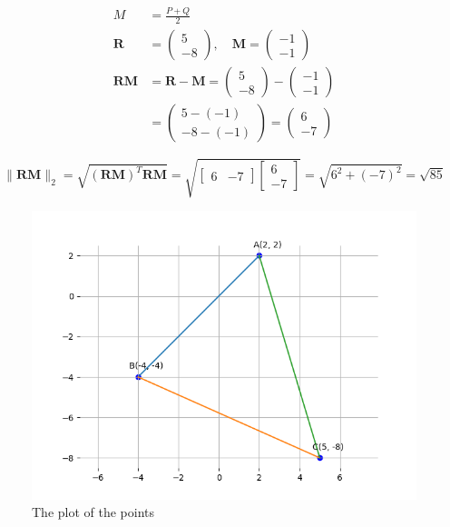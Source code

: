 \documentclass[journal]{IEEEtran}
\numberwithin{equation}{enumi}
\numberwithin{figure}{enumi}
\begin{document}
\begin{align*}
 M &= \frac{P + Q}{2} \\
\mathbf{R} &= \begin{pmatrix} 5 \\ -8 \end{pmatrix}, \quad \mathbf{M} = \begin{pmatrix} -1 \\ -1 \end{pmatrix} \\
\mathbf{RM} &= \mathbf{R} - \mathbf{M} = \begin{pmatrix} 5 \\ -8 \end{pmatrix} - \begin{pmatrix} -1 \\ -1 \end{pmatrix} \\
&= \begin{pmatrix} 5 - (-1) \\ -8 - (-1) \end{pmatrix} = \begin{pmatrix} 6 \\ -7 \end{pmatrix}
\end{align*}




\[
\| \mathbf{RM} \|_2 = \sqrt{\mathbf{(RM)
}^T \mathbf{RM}} = \sqrt{\begin{bmatrix} 6 & -7 \end{bmatrix} \begin{bmatrix} 6 \\ -7 \end{bmatrix}} = \sqrt{6^2 + (-7)^2} = \sqrt{85}
\]





\begin{figure}[h!]
  \hspace{-1cm}
  \includegraphics[width=1.2\textwidth]{Figure_1.png}
  
  \caption{The plot of the points }
  \label{fig:your_label}
\end{figure}
\end{document}
